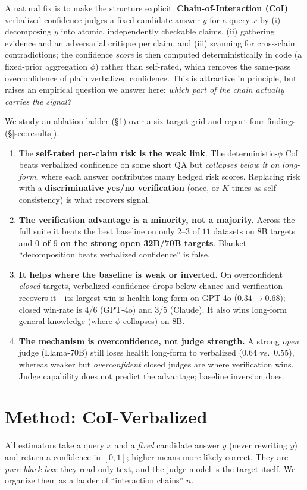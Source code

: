 \documentclass[11pt]{article}
\begin{document}
A natural fix is to make the structure explicit. \textbf{Chain-of-Interaction (CoI)}
verbalized confidence judges a fixed candidate answer $y$ for a query $x$ by (i)
decomposing $y$ into atomic, independently checkable claims, (ii) gathering evidence and
an adversarial critique per claim, and (iii) scanning for cross-claim contradictions;
the confidence \emph{score} is then computed deterministically in code (a fixed-prior
aggregation $\phi$) rather than self-rated, which removes the same-pass overconfidence of
plain verbalized confidence. This is attractive in principle, but raises an empirical
question we answer here: \emph{which part of the chain actually carries the signal?}

We study an ablation ladder (\S\ref{sec:method}) over a six-target grid and report four
findings (\S\ref{sec:results}).
\begin{enumerate}[leftmargin=1.4em,itemsep=1pt,topsep=2pt]
\item The \textbf{self-rated per-claim risk is the weak link}. The deterministic-$\phi$
CoI beats verbalized confidence on some short QA but \emph{collapses below it on long-form},
where each answer contributes many hedged risk scores. Replacing risk with a
\textbf{discriminative yes/no verification} (once, or $K$ times as self-consistency) is
what recovers signal.
\item \textbf{The verification advantage is a minority, not a majority.} Across the full
suite it beats the best baseline on only $2$--$3$ of $11$ datasets on 8B targets and
\textbf{$0$ of $9$ on the strong open 32B/70B targets}. Blanket ``decomposition beats
verbalized confidence'' is false.
\item \textbf{It helps where the baseline is weak or inverted.} On overconfident
\emph{closed} targets, verbalized confidence drops below chance and verification recovers
it---its largest win is health long-form on GPT-4o ($0.34\rightarrow0.68$); closed win-rate
is $4/6$ (GPT-4o) and $3/5$ (Claude). It also wins long-form general knowledge (where $\phi$
collapses) on 8B.
\item \textbf{The mechanism is overconfidence, not judge strength.} A strong \emph{open}
judge (Llama-70B) still loses health long-form to verbalized ($0.64$ vs.\ $0.55$), whereas
weaker but \emph{overconfident} closed judges are where verification wins. Judge capability
does not predict the advantage; baseline inversion does.
\end{enumerate}

\section{Method: CoI-Verbalized}\label{sec:method}
All estimators take a query $x$ and a \emph{fixed} candidate answer $y$ (never rewriting
$y$) and return a confidence in $[0,1]$; higher means more likely correct. They are
\emph{pure black-box}: they read only text, and the judge model is the target itself. We
organize them as a ladder of ``interaction chains'' $n$.
\end{document}
